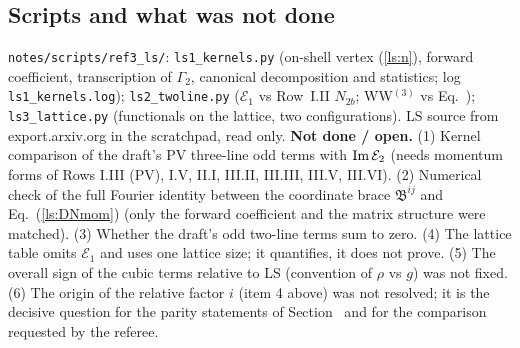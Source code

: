\subsection{Scripts and what was not done}\label{ls:num}
\texttt{notes/scripts/ref3\_ls/}: \texttt{ls1\_kernels.py} (on-shell vertex (\ref{ls:n}), forward coefficient, transcription of $\Gamma_2$, canonical decomposition and statistics; log \texttt{ls1\_kernels.log}); \texttt{ls2\_twoline.py} ($\mathcal E_1$ vs Row~I.II $N_{2b}$; WW$^{(3)}$ vs Eq.~); \texttt{ls3\_lattice.py} (functionals on the lattice, two configurations). LS source from export.arxiv.org in the scratchpad, read only.
\textbf{Not done / open.} (1) Kernel comparison of the draft's PV three-line odd terms with ${\rm Im}\,\mathcal E_2$ (needs momentum forms of Rows I.III (PV), I.V, II.I, III.II, III.III, III.V, III.VI). (2) Numerical check of the full Fourier identity between the coordinate brace $\mathfrak B^{ij}$ and Eq.~(\ref{ls:DNmom}) (only the forward coefficient and the matrix structure were matched). (3) Whether the draft's odd two-line terms sum to zero. (4) The lattice table omits $\mathcal E_1$ and uses one lattice size; it quantifies, it does not prove. (5) The overall sign of the cubic terms relative to LS (convention of $\rho$ vs $g$) was not fixed. (6) The origin of the relative factor $i$ (item 4 above) was not resolved; it is the decisive question for the parity statements of Section~ and for the comparison requested by the referee.
